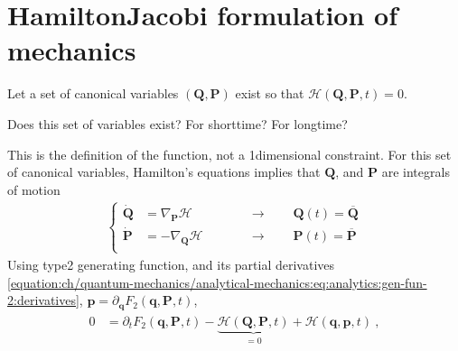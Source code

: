 \documentclass[letterpaper,10pt,english]{jupyterBook}
\begin{document}
\sphinxAtStartPar
{}


\section{Hamilton\sphinxhyphen{}Jacobi formulation of mechanics}
\label{\detokenize{ch/quantum-mechanics/analytical-mechanics:hamilton-jacobi-formulation-of-mechanics}}\label{\detokenize{ch/quantum-mechanics/analytical-mechanics:quantum-mechanics-analytical-mechanics-hamilton-jacobi}}
\sphinxAtStartPar
Let a set of canonical variables \((\mathbf{Q}, \mathbf{P})\) exist so that \(\mathscr{H}(\mathbf{Q}, \mathbf{P}, t) = 0\).%
\begin{footnote}[2]\sphinxAtStartFootnote
Does this set of variables exist? For short\sphinxhyphen{}time? For long\sphinxhyphen{}time?
%
\end{footnote}  This is the definition of the function, not a 1\sphinxhyphen{}dimensional constraint. For this set of canonical variables, Hamilton’s equations implies that \(\mathbf{Q}\), and \(\mathbf{P}\) are integrals of motion
\begin{equation*}
\begin{split}\left\{
\begin{aligned}
  \dot{\mathbf{Q}} & = \nabla_{\mathbf{P}} \mathscr{H} && \qquad \rightarrow \qquad \mathbf{Q}(t) = \overline{\mathbf{Q}} \\
  \dot{\mathbf{P}} & =-\nabla_{\mathbf{Q}} \mathscr{H} && \qquad \rightarrow \qquad \mathbf{P}(t) = \overline{\mathbf{P}} \\
\end{aligned}
\right.\end{split}
\end{equation*}
\sphinxAtStartPar
Using type\sphinxhyphen{}2 generating function, and its partial derivatives \eqref{equation:ch/quantum-mechanics/analytical-mechanics:eq:analytics:gen-fun-2:derivatives}, \(\mathbf{p} = \partial_{\mathbf{q}} F_2(\mathbf{q}, \mathbf{P}, t)\),
\begin{equation*}
\begin{split}\begin{aligned}
  0
  & = \partial_t F_2\left( \mathbf{q}, \mathbf{P}, t \right) - \underbrace{\mathscr{H}(\mathbf{Q}, \mathbf{P}, t)}_{=0} + \mathcal{H}(\mathbf{q}, \mathbf{p}, t) \ ,
\end{aligned}\end{split}
\end{equation*}
\sphinxAtStartPar
\end{document}
